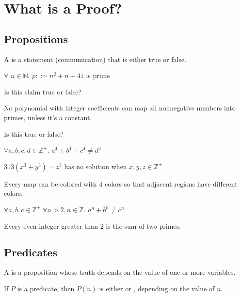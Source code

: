 \chapter{What is a Proof?}
\section{Propositions}
\begin{definition}
    A  is a statement (communication) that is either
    true or false.
\end{definition}
\begin{claim}
    $\forall$ $n \in \mathbb{N}$, $p::=n^2+n+41$ is prime
\end{claim}
 Is this claim true or false?
\begin{claim}
    No polynomial with integer coefficients can map all nonnegative numbers
    into primes, unless it's a constant.
\end{claim}
 Is this true or false?
\begin{claim}
    $\forall a,b,c,d \in \mathbb{Z^{+}}$. $a^4 + b^4 + c^4 \neq d^4$
\end{claim}
\begin{claim}
    $313(x^3 + y^3) = z^3$ has no solution when $x,y,z \in \mathbb{Z^{+}}$
\end{claim}
\begin{claim}
    Every map can be colored with $4$ colors so that adjacent regions have different
    colors.
\end{claim}
\begin{claim}
    $\forall a,b,c \in \mathbb{Z^{+}}\;\forall n > 2, n \in \mathbb{Z}$. $a^n + b^n \neq c^n$
\end{claim}
\begin{claim}[Goldbach]
    Every even integer greater than $2$ is the sum of two primes.
\end{claim}

\section{Predicates}
\begin{definition}
    A  is a proposition whose truth depends on the value of one
    or more variables.
\end{definition}
If $P$ is a predicate, then $P(n)$ is either  or , depending on
the value of $n$.

